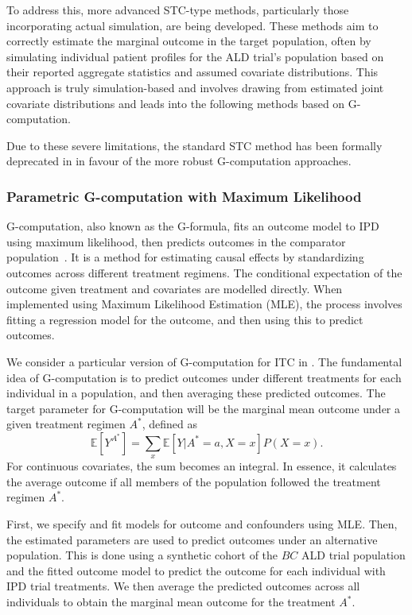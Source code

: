 \documentclass[article]{jss}
\begin{document}
To address this, more advanced STC-type methods, particularly those incorporating actual simulation, are being developed. These methods aim to correctly estimate the marginal outcome in the target population, often by simulating individual patient profiles for the ALD trial's population based on their reported aggregate statistics and assumed covariate distributions. This approach is truly simulation-based and involves drawing from estimated joint covariate distributions and leads into the following methods based on G-computation.

Due to these severe limitations, the standard STC method has been formally deprecated in  in favour of the more robust G-computation approaches.

\subsubsection{Parametric G-computation with Maximum Likelihood}
G-computation, also known as the G-formula, fits an outcome model to IPD using maximum likelihood, then predicts outcomes in the comparator population~\citep{RemiroAzocar2022a}. It is a method for estimating causal effects by standardizing outcomes across different treatment regimens. The conditional expectation of the outcome given treatment and covariates are modelled directly. When implemented using Maximum Likelihood Estimation (MLE), the process involves fitting a regression model for the outcome, and then using this to predict outcomes.

We consider a particular version of G-computation for ITC in .
The fundamental idea of G-computation is to predict outcomes under different treatments for each individual in a population, and then averaging these predicted outcomes. The target parameter for G-computation will be the marginal mean outcome under a given treatment regimen $A^*$, defined as
$$
\mathbb{E}[Y^{A^*}] = \sum_{x} \mathbb{E}[Y | A^*=a, X=x] P(X=x).
$$
For continuous covariates, the sum becomes an integral. In essence, it calculates the average outcome if all members of the population followed the treatment regimen $A^*$.

First, we specify and fit models for outcome and confounders using MLE. Then, the estimated parameters are used to predict outcomes under an alternative population. This is done using a synthetic cohort of the $BC$ ALD trial population and the fitted outcome model to predict the outcome for each individual with IPD trial treatments. We then average the predicted outcomes across all individuals to obtain the marginal mean outcome for the treatment $A^*$.
\end{document}
